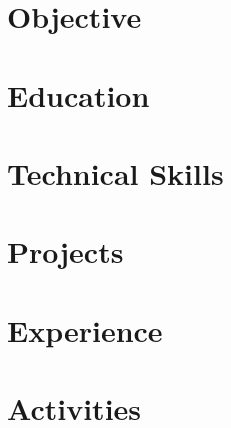 \documentclass[letter,10pt]{article}
\begin{document}
\section{Objective}


\section{Education}


\section{Technical Skills}


% 

\section{Projects}


\section{Experience}


\section{Activities}

\end{document}
